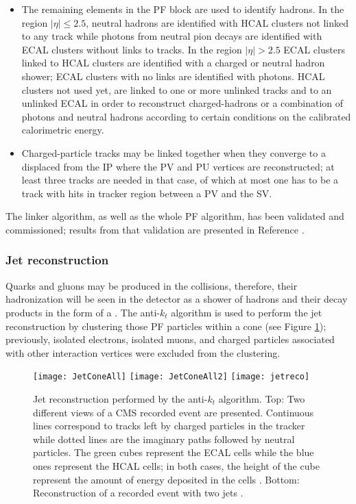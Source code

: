 \begin{itemize}
\item The remaining elements in the PF block are used to identify hadrons. In the region $|\eta| \leq 2.5$, neutral hadrons are identified with HCAL clusters not linked to any track while photons from neutral pion decays are identified with ECAL clusters without links to tracks. In the region $|\eta| >2.5$ ECAL clusters linked to HCAL clusters are identified with a charged or neutral hadron shower; ECAL clusters with no links are identified with photons.
  HCAL clusters not used yet, are linked to one or more unlinked tracks and to an unlinked ECAL in order to reconstruct charged-hadrons or a combination of photons and neutral hadrons according to certain conditions on the calibrated calorimetric energy.         

\item Charged-particle tracks may be linked together when they converge to a  displaced from the IP where the PV and PU vertices are reconstructed; at least three tracks are needed in that case, of which at most one has to be a track with hits in tracker region between a PV and the SV.
\end{itemize}

The linker algorithm, as well as the whole PF algorithm, has been validated and commissioned; results from that validation are presented in Reference \cite{particle_flow}.

\subsubsection*{Jet reconstruction}

Quarks and gluons may be produced in the \pp collisions, therefore, their hadronization will be seen in the detector as a shower of hadrons and their decay products in the form of a . The anti-$k_t$ algorithm \cite{antikt} is used to perform the jet reconstruction by clustering those PF particles within a cone (see Figure \ref{fig:jetcone}); previously, isolated electrons, isolated muons, and charged particles associated with other interaction vertices were excluded from the clustering.  

\begin{figure}[!h]
  \centering
  \texttt{[image: JetConeAll]}
  \texttt{[image: JetConeAll2]}
    \texttt{[image: jetreco]}
  \caption[Jet reconstruction.]{Jet reconstruction performed by the anti-$k_t$ algorithm. Top: Two different views of a CMS recorded event are presented. Continuous lines correspond to tracks left by charged particles in the tracker while dotted lines are the imaginary paths followed by neutral particles. The green cubes represent the ECAL cells while the blue ones represent the HCAL cells; in both cases, the height of the cube represent the amount of energy deposited in the cells \cite{jetconeview}. Bottom: Reconstruction of a recorded event with two jets \cite{jetreco}.}\label{fig:jetcone}
\end{figure}

